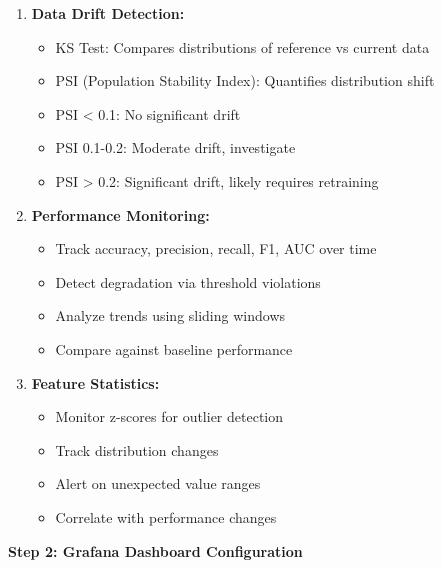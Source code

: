 \begin{enumerate}
    \item \textbf{Data Drift Detection:}
    \begin{itemize}
        \item KS Test: Compares distributions of reference vs current data
        \item PSI (Population Stability Index): Quantifies distribution shift
        \item PSI < 0.1: No significant drift
        \item PSI 0.1-0.2: Moderate drift, investigate
        \item PSI > 0.2: Significant drift, likely requires retraining
    \end{itemize}

    \item \textbf{Performance Monitoring:}
    \begin{itemize}
        \item Track accuracy, precision, recall, F1, AUC over time
        \item Detect degradation via threshold violations
        \item Analyze trends using sliding windows
        \item Compare against baseline performance
    \end{itemize}

    \item \textbf{Feature Statistics:}
    \begin{itemize}
        \item Monitor z-scores for outlier detection
        \item Track distribution changes
        \item Alert on unexpected value ranges
        \item Correlate with performance changes
    \end{itemize}
\end{enumerate}

\textbf{Step 2: Grafana Dashboard Configuration}

